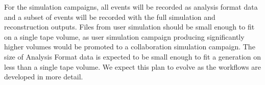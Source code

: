 For the simulation campaigns, all events will be recorded as analysis format data and a subset of events will be recorded with the full simulation and reconstruction outputs. Files from user simulation should be small enough to fit on a single tape volume, as user simulation campaign producing significantly higher volumes would be promoted to a collaboration simulation campaign. The size of Analysis Format data is expected to be small enough to fit a generation on less than a single tape volume. We expect this plan to evolve as the workflows are developed in more detail.




